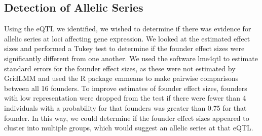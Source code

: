 \documentclass[article,9pt,twocolumn,twoside]{rilabRxiv}
\begin{document}




\subsection{Detection of Allelic Series}
    Using the eQTL we identified, we wished to determine if there was evidence for allelic series at loci affecting gene expression.
    We looked at the estimated effect sizes and performed a Tukey test to determine if the founder effect sizes were significantly different from one another.
    We used the software lme4qtl to estimate standard errors for the founder effect sizes, as these were not estimated by GridLMM and used the R package emmeans to make pairwise comparisons between all 16 founders.
    To improve estimates of founder effect sizes, founders with low representation were dropped from the test if there were fewer than 4 individuals with a probability for that founders was greater than 0.75 for that founder.
    In this way, we could determine if the founder effect sizes appeared to cluster into multiple groups, which would suggest an allelic series at that eQTL.
\end{document}
